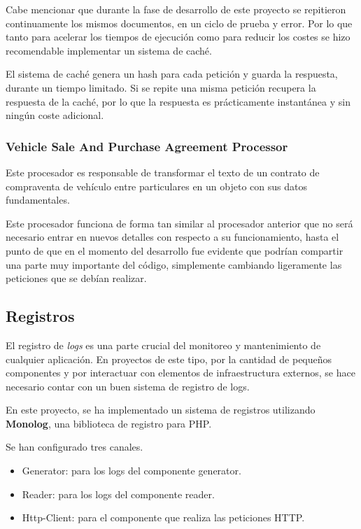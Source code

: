 Cabe mencionar que durante la fase de desarrollo de este proyecto se repitieron continuamente los mismos documentos,
en un ciclo de prueba y error.
Por lo que tanto para acelerar los tiempos de ejecución como para reducir los costes se hizo recomendable implementar un
sistema de caché.

El sistema de caché genera un hash para cada petición y guarda la respuesta, durante un tiempo limitado.
Si se repite una misma petición recupera la respuesta de la caché, por lo que la respuesta es prácticamente
instantánea y sin ningún coste adicional.

\subsubsection*{Vehicle Sale And Purchase Agreement Processor}

Este procesador es responsable de transformar el texto de un contrato de compraventa de vehículo entre particulares en
un objeto con sus datos fundamentales.

Este procesador funciona de forma tan similar al procesador anterior que no será necesario entrar en nuevos detalles
con respecto a su funcionamiento, hasta el punto de que en el momento del desarrollo fue evidente que podrían
compartir una parte muy importante del código, simplemente cambiando ligeramente las peticiones que se debían realizar.

\subsection*{Registros}\label{subsec:logs}

El registro de \textit{logs} es una parte crucial del monitoreo y mantenimiento de cualquier aplicación.
En proyectos de este tipo, por la cantidad de pequeños componentes y por interactuar con elementos de infraestructura
externos, se hace necesario contar con un buen sistema de registro de logs.

En este proyecto, se ha implementado un sistema de registros utilizando \textbf{Monolog}, una biblioteca de registro
para PHP.

Se han configurado tres canales.

\begin{itemize}
    \item Generator: para los logs del componente generator.
    \item Reader: para los logs del componente reader.
    \item Http-Client: para el componente que realiza las peticiones HTTP.
\end{itemize}


